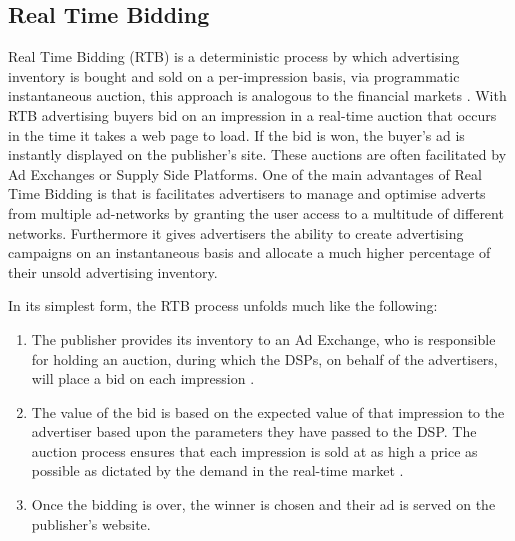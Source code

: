 \documentclass{article}
\begin{document}
\subsection{Real Time Bidding}
Real Time Bidding (RTB) is a deterministic process by which advertising inventory is bought and sold on a per-impression basis, via programmatic instantaneous auction, this approach is analogous to the financial markets \parencite{RTB}. With RTB advertising buyers bid on an impression in a real-time auction that occurs in the time it takes a web page to load. If the bid is won, the buyer's ad is instantly displayed on the publisher's site. These auctions are often facilitated by Ad Exchanges or Supply Side Platforms. One of the main advantages of Real Time Bidding is that is facilitates advertisers to manage and optimise adverts from multiple ad-networks by granting the user access to a multitude of different networks. Furthermore it gives advertisers the ability to create advertising campaigns on an instantaneous basis and allocate a much higher percentage of their unsold advertising inventory. \newline

In its simplest form, the RTB process unfolds much like the following: 
\begin{enumerate}
\item The publisher provides its inventory to an Ad Exchange, who is responsible for holding an auction, during which the DSPs, on behalf of the advertisers, will place a bid on each impression \parencite{howRTBWorks}. 
\item The value of the bid is based on the expected value of that impression to the advertiser based upon the parameters they have passed to the DSP. The auction process ensures that each impression is sold at as high a price as possible as dictated by the demand in the real-time market \parencite{howRTBWorks}. 
\item Once the bidding is over, the winner is chosen and their ad is served on the publisher's website. 
\end{enumerate}
\end{document}
